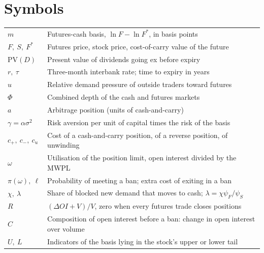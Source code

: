 \chapter*{Symbols}
\thispagestyle{plain}
{\renewcommand{\arraystretch}{1.15}
\begin{tabularx}{\linewidth}{@{}>{\leavevmode\color{accent}}p{2.9cm}L@{}}
$m$ & Futures-cash basis, $\ln F-\ln F^*$, in basis points \\
$F,\ S,\ F^*$ & Futures price, stock price, cost-of-carry value of the future \\
$\mathrm{PV}(D)$ & Present value of dividends going ex before expiry \\
$r,\ \tau$ & Three-month interbank rate; time to expiry in years \\
$u$ & Relative demand pressure of outside traders toward futures \\
$\Phi$ & Combined depth of the cash and futures markets \\
$a$ & Arbitrage position (units of cash-and-carry) \\
$\gamma=\alpha\sigma^2$ & Risk aversion per unit of capital times the risk of the basis \\
$c_+,\ c_-,\ c_u$ & Cost of a cash-and-carry position, of a reverse position, of unwinding \\
$\omega$ & Utilisation of the position limit, open interest divided by the MWPL \\
$\pi(\omega),\ \ell$ & Probability of meeting a ban; extra cost of exiting in a ban \\
$\chi,\ \lambda$ & Share of blocked new demand that moves to cash; $\lambda=\chi\psi_F/\psi_S$ \\
$R$ & $(\Delta OI+V)/V$, zero when every futures trade closes positions \\
$C$ & Composition of open interest before a ban: change in open interest over volume \\
$U,\ L$ & Indicators of the basis lying in the stock's upper or lower tail \\
\end{tabularx}}

\mainmatter
\pagestyle{body}
